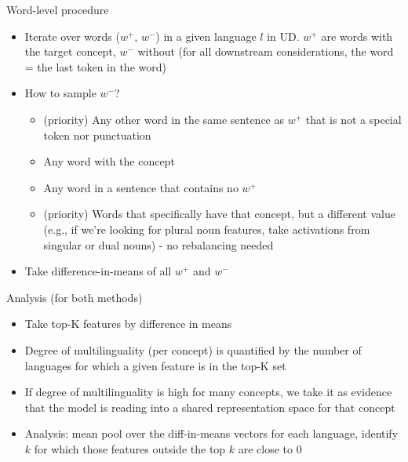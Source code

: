 \documentclass[11pt]{article}
\begin{document}
\begin{itemize}
    Word-level procedure
    \begin{itemize}
        \item Iterate over words ($w^+$, $w^-$) in a given language $l$ in UD. $w^+$ are words with the target concept, $w^-$ without
        (for all downstream considerations, the word = the last token in the word)
        \item How to sample $w^-$?
        \begin{itemize}
            \item (priority) Any other word in the same sentence as $w^+$ that is not a special token nor punctuation
            \item Any word with the concept
            \item Any word in a sentence that contains no $w^+$
            \item (priority) Words that specifically have that concept, but a different value (e.g., if we're looking for plural noun features, take activations from singular or dual nouns) - no rebalancing needed
        \end{itemize}
        \item Take difference-in-means of all $w^+$ and $w^-$
    \end{itemize}

    Analysis (for both methods)
    \begin{itemize}
        \item Take top-K features by difference in means
        \item Degree of multilinguality (per concept) is quantified by the number of languages for which a given feature is in the top-K set
        \item If degree of multilinguality is high for many concepts, we take it as evidence that the model is reading into a shared representation space for that concept
        \item Analysis: mean pool over the diff-in-means vectors for each language, identify $k$ for which those features outside the top $k$ are close to 0
    \end{itemize}
    

\end{itemize}
\end{document}
